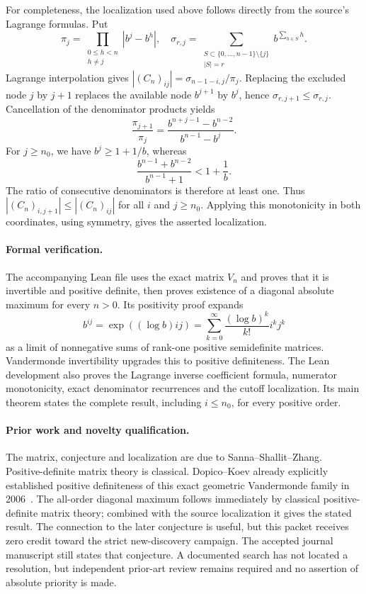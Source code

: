 \documentclass[11pt]{article}
\begin{document}
For completeness, the localization used above follows directly from the source's Lagrange formulas. Put
\[
 \pi_j=\prod_{\substack{0\le h<n\\h\ne j}}|b^j-b^h|,
 \quad
 \sigma_{r,j}=\sum_{\substack{S\subset\{0,\ldots,n-1\}\setminus\{j\}\\|S|=r}}
 b^{\sum_{h\in S}h}.
\]
Lagrange interpolation gives $|(C_n)_{ij}|=\sigma_{n-1-i,j}/\pi_j$.
Replacing the excluded node $j$ by $j+1$ replaces the available node $b^{j+1}$ by $b^j$, hence $\sigma_{r,j+1}\le\sigma_{r,j}$. Cancellation of the denominator products yields
\[
 \frac{\pi_{j+1}}{\pi_j}
 =\frac{b^{n+j-1}-b^{n-2}}{b^{n-1}-b^j}.
\]
For $j\ge n_0$, we have $b^j\ge1+1/b$, whereas
\[
 \frac{b^{n-1}+b^{n-2}}{b^{n-1}+1}<1+\frac1b.
\]
The ratio of consecutive denominators is therefore at least one. Thus $|(C_n)_{i,j+1}|\le|(C_n)_{ij}|$ for all $i$ and $j\ge n_0$. Applying this monotonicity in both coordinates, using symmetry, gives the asserted localization.

\paragraph{Formal verification.}
The accompanying Lean file uses the exact matrix $V_n$ and proves that it is invertible and positive definite, then proves existence of a diagonal absolute maximum for every $n>0$. Its positivity proof expands
\[
 b^{ij}=\exp((\log b)ij)
 =\sum_{k=0}^{\infty}\frac{(\log b)^k}{k!}i^k j^k
\]
as a limit of nonnegative sums of rank-one positive semidefinite matrices. Vandermonde invertibility upgrades this to positive definiteness. The Lean development also proves the Lagrange inverse coefficient formula, numerator monotonicity, exact denominator recurrences and the cutoff localization. Its main theorem states the complete result, including $i\le n_0$, for every positive order.

\paragraph{Prior work and novelty qualification.}
The matrix, conjecture and localization are due to Sanna--Shallit--Zhang. Positive-definite matrix theory is classical. Dopico--Koev already explicitly established positive definiteness of this exact geometric Vandermonde family in 2006~\cite{DK}. The all-order diagonal maximum follows immediately by classical positive-definite matrix theory; combined with the source localization it gives the stated result. The connection to the later conjecture is useful, but this packet receives zero credit toward the strict new-discovery campaign. The accepted journal manuscript still states that conjecture. A documented search has not located a resolution, but independent prior-art review remains required and no assertion of absolute priority is made.
\end{document}
